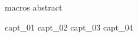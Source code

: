 \documentclass[12pt,a4paper,oneside,english]{book}
\begin{document}




\runfrontend{}

{macros}
{abstract}

\sumario

\listadefiguras

\listadetabelas


	\listadesimbolos

	\listadeacronimos

	\listadenotacoes

\markboth{}{}

\mainmatter 
\setcounter{page}{1} \pagestyle{plain} 

{capt_01}
{capt_02}
{capt_03}
{capt_04}



%
% 
%


\end{document}
